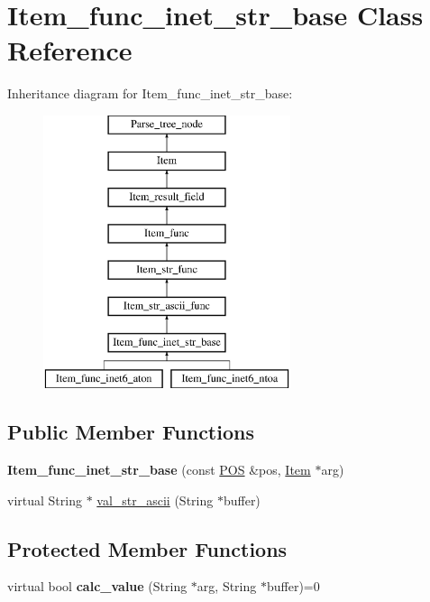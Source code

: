 \hypertarget{classItem__func__inet__str__base}{}\section{Item\+\_\+func\+\_\+inet\+\_\+str\+\_\+base Class Reference}
\label{classItem__func__inet__str__base}
Inheritance diagram for Item\+\_\+func\+\_\+inet\+\_\+str\+\_\+base\+:\begin{figure}[H]
\begin{center}
\leavevmode
\includegraphics[height=8.000000cm]{classItem__func__inet__str__base}
\end{center}
\end{figure}
\subsection*{Public Member Functions}
\begin{DoxyCompactItemize}
\item 
\mbox{\label{classItem__func__inet__str__base_ade7bf1c8020c3172765fa991c9605ce7}} 
{\bfseries Item\+\_\+func\+\_\+inet\+\_\+str\+\_\+base} (const \mbox{\hyperlink{structYYLTYPE}{P\+OS}} \&pos, \mbox{\hyperlink{classItem}{Item}} $\ast$arg)
\item 
virtual String $\ast$ \mbox{\hyperlink{classItem__func__inet__str__base_a264e8d2eb93e0b94b3fa195fb5540aa3}{val\+\_\+str\+\_\+ascii}} (String $\ast$buffer)
\end{DoxyCompactItemize}
\subsection*{Protected Member Functions}
\begin{DoxyCompactItemize}
\item 
\mbox{\label{classItem__func__inet__str__base_a29c5167c70ea1e2d0dde4c1013ff300a}} 
virtual bool {\bfseries calc\+\_\+value} (String $\ast$arg, String $\ast$buffer)=0
\end{DoxyCompactItemize}
